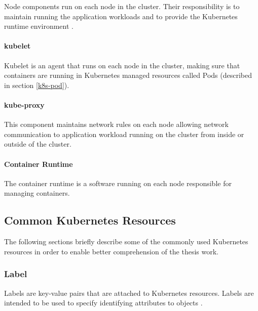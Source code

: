 Node components run on each node in the cluster. Their responsibility is to maintain running the application workloads and to provide the Kubernetes runtime environment \cite{KubernetesArchitecture}.

\paragraph{kubelet} Kubelet is an agent that runs on each node in the cluster, making sure that containers are running in Kubernetes managed resources called Pods (described in section \ref{k8s-pod}).

\paragraph{kube-proxy} This component maintains network rules on each node allowing network communication to application workload running on the cluster from inside or outside of the cluster.

\paragraph{Container Runtime} The container runtime is a software running on each node responsible for managing containers.

\subsection{Common Kubernetes Resources}

The following sections briefly describe some of the commonly used Kubernetes resources in order to enable better comprehension of the thesis work.

\subsubsection{Label}

Labels are key-value pairs that are attached to Kubernetes resources. Labels are intended to be used to specify identifying attributes to objects \cite{KubernetesLabel}.

